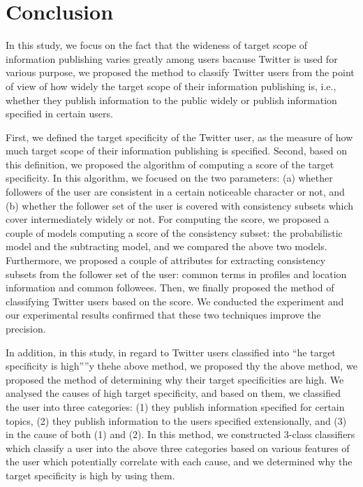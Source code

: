 \section{Conclusion}
\label{sec:Conclusion}

In this study, we focus on the fact that the wideness of target scope of
information publishing varies greatly among users bacause Twitter is
used for various purpose, we proposed the method to classify Twitter
users from the point of view of how widely the target scope of their
information publishing is, i.e., whether they publish information to the
public widely or publish information specified in certain users.

First, we defined the target specificity of the Twitter user, as the
measure of how much target scope of their information publishing is
specified.  Second, based on this definition, we proposed the algorithm
of computing a score of the target specificity.  In this algorithm, we
focused on the two parameters: (a) whether followers of the user are
consistent in a certain noticeable character or not, and (b) whether the
follower set of the user is covered with consistency subsets which cover
intermediately widely or not.  For computing the score, we proposed a
couple of models computing a score of the consistency subset: the
probabilistic model and the subtracting model, and we compared the above
two models.  Furthermore, we proposed a couple of attributes for
extracting consistency subsets from the follower set of the user: common
terms in profiles and location information and common followees.  Then,
we finally proposed the method of classifying Twitter users based on the
score.  We conducted the experiment and our experimental results
confirmed that these two techniques improve the precision.


In addition, in this study, in regard to Twitter users classified into
``he target specificity is high”''y thehe above method, we proposed thy
the above method, we proposed the method of determining why their target
specificities are high.  We analysed the causes of high target
specificity, and based on them, we classified the user into three
categories: (1) they publish information specified for certain topics,
(2) they publish information to the users specified extensionally, and
(3) in the cause of both (1) and (2).  In this method, we constructed
3-class classifiers which classify a user into the above three
categories based on various features of the user which potentially
correlate with each cause, and we determined why the target specificity
is high by using them.
